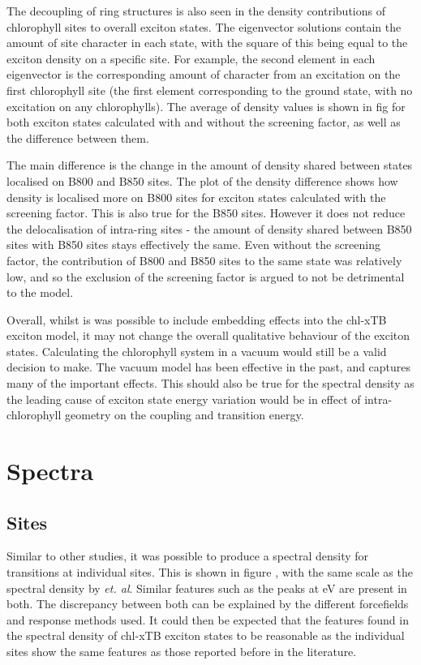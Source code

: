 The decoupling of ring structures is also seen in the density contributions of chlorophyll
sites to overall exciton states. The eigenvector solutions contain the amount of
site character in each state, with the square of this being equal to the exciton
density on a specific site. For example, the second element in each eigenvector 
is the corresponding amount of character from an excitation on the first chlorophyll
site (the first element corresponding to the ground state, with no excitation on
any chlorophylls). The average of density values is shown in fig for both exciton
states calculated with and without the screening factor, as well as the difference
between them.

The main difference is the change in the amount of density shared between states
localised on B800 and B850 sites. The plot of the density difference shows how density
is localised more on B800 sites for exciton states calculated with the screening
factor. This is also true for the B850 sites. However it does not reduce the delocalisation
of intra-ring sites - the amount of density shared between B850 sites with B850 
sites stays effectively the same. Even without the screening factor, the contribution
of B800 and B850 sites to the same state was relatively low, and so the exclusion
of the screening factor is argued to not be detrimental to the model.

Overall, whilst is was possible to include embedding effects into the chl-xTB exciton
model, it may not change the overall qualitative behaviour of the exciton states.
Calculating the chlorophyll system in a vacuum would still be a valid decision to
make. The vacuum model has been effective in the past, and captures many of the
important effects. This should also be true for the spectral density as the leading
cause of exciton state energy variation would be in effect of intra-chlorophyll 
geometry on the coupling and transition energy.

\section{Spectra}
\label{sec:sites_states_couplings}

\subsection{Sites}
\label{subsec:sites}

Similar to other studies, it was possible to produce a spectral density for \Qy 
transitions at individual sites. This is shown in figure , with the same scale as
the spectral density by \emph{et. al}. Similar features such as the peaks at eV
are present in both. The discrepancy between both can be explained by the different
forcefields and response methods used. It could then be expected that the features 
found in the spectral density of chl-xTB exciton states to be reasonable as the 
individual sites show the same features as those reported before in the literature.

